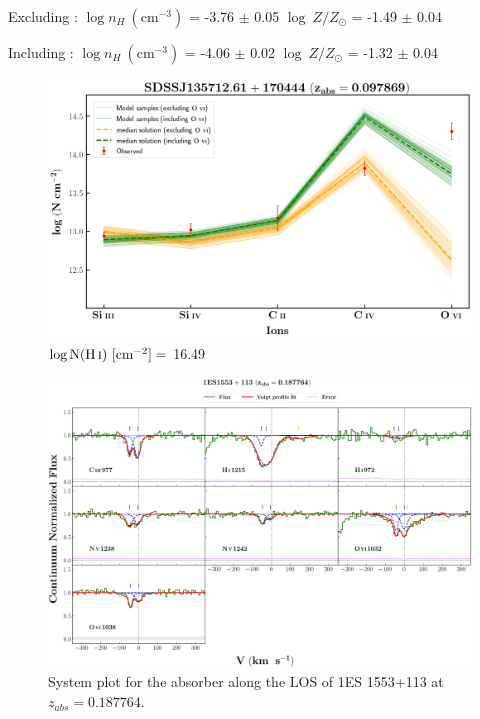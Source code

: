   Excluding  : $\log n_H \ (\text{cm}^{-3})$ = -3.76 $\pm$ 0.05 \hspace{10mm} $\log \ Z/Z_\odot$ = -1.49 $\pm$ 0.04
  
  Including  : $\log n_H \ (\text{cm}^{-3})$ = -4.06 $\pm$ 0.02 \hspace{10mm} $\log \ Z/Z_\odot$ = -1.32 $\pm$ 0.04 
  
  \newpage
  
  \begin{figure}[!h]
      \centering
      \includegraphics[width=0.9\linewidth]{Ionisation-Modelling-Plots/s135712-z=0.097869-compII.png}
      \caption{$\log \text{N}(\ion{H}{i}) \ [\text{cm}^{-2}]=$ 16.49}
  \end{figure}
  
  
  \newpage
  
  \begin{landscape}
  
  \begin{figure}
      \centering
      \vspace{-20mm}
      \hspace*{-35mm}
      \includegraphics[width=1.25\linewidth]{System-Plots/1ES1553+113_z=0.187764_sys_plot.png}
      \caption{System plot for the absorber along the LOS of 1ES 1553+113 at $z_{abs} = 0.187764$. }
  \end{figure}
  
  \end{landscape}
  
